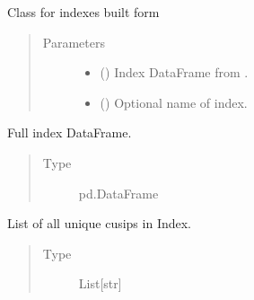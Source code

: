 \documentclass[letterpaper,10pt,english]{report}
\begin{document}
\begin{fulllineitems}
\label{\detokenize{index:lgimapy.index.Index}}
Class for indexes built form 
\begin{quote}\begin{description}
\item[{Parameters}] \leavevmode\begin{itemize}
\item {} 
 () \textendash{} Index DataFrame from .

\item {} 
 (\sphinxstyleliteralemphasis{\sphinxupquote{, }}) \textendash{} Optional name of index.

\end{itemize}

\end{description}\end{quote}

\begin{fulllineitems}
\label{\detokenize{index:lgimapy.index.Index.df}}
Full index DataFrame.
\begin{quote}\begin{description}
\item[{Type}] \leavevmode
pd.DataFrame

\end{description}\end{quote}

\end{fulllineitems}


\begin{fulllineitems}
\label{\detokenize{index:lgimapy.index.Index.cuisps}}
List of all unique cusips in Index.
\begin{quote}\begin{description}
\item[{Type}] \leavevmode
List{[}str{]}


\end{description}
\end{quote}
\end{fulllineitems}
\end{fulllineitems}
\end{document}
